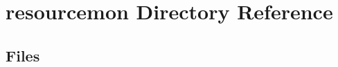 \section{resourcemon Directory Reference}
\label{dir_8c6d421951168313830ea8bf99014d46}
\subsection*{Files}
\begin{DoxyCompactItemize}
\end{DoxyCompactItemize}
